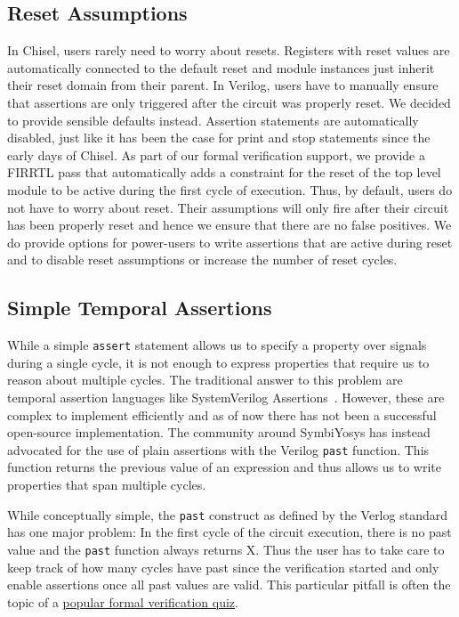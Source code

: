 \documentclass[conference]{IEEEtran}
\newcommand{\code}[1]{{\small{\texttt{#1}}}}
\begin{document}
\subsection{Reset Assumptions}\label{sec:reset}

In Chisel, users rarely need to worry about resets.
Registers with reset values are automatically connected to the default reset %
and module instances just inherit their reset domain from their parent.
In Verilog, users have to manually ensure that assertions are only triggered after the circuit was properly reset.
We decided to provide sensible defaults instead.
Assertion statements are automatically disabled, just like it has been the case for print and stop statements
since the early days of Chisel.
As part of our formal verification support, we provide a FIRRTL pass
that automatically adds a constraint for the reset of the top level module to be active during the first cycle of execution.
Thus, by default, users do not have to worry about reset. Their assumptions will only fire
after their circuit has been properly reset and hence we ensure that there are no false positives.
We do provide options for power-users to write assertions that are active during reset and to
disable reset assumptions or increase the number of reset cycles.


\subsection{Simple Temporal Assertions}\label{sec:past}


While a simple \code{assert} statement allows us to specify a property over signals during a single
cycle, it is not enough to express properties that require us to reason about multiple cycles.
The traditional answer to this problem are temporal assertion languages like SystemVerilog Assertions~\cite{SystemVerilog}.
However, these are complex to implement efficiently and as of now there has not been a successful open-source implementation.
The community around SymbiYosys has instead advocated for the use of plain assertions with the Verilog \code{past}
function. This function returns the previous value of an expression and thus allows us to write properties that span multiple cycles.

While conceptually simple, the \code{past} construct as defined by the Verlog standard has one major problem:
In the first cycle of the circuit execution, there is no past value and the \code{past} function always returns X.
Thus the user has to take care to keep track of how many cycles have past since the verification started and only enable assertions
once all past values are valid.
This particular pitfall is often the topic of a \href{http://zipcpu.com/quiz/2019/11/16/quiz07.html}{popular formal verification quiz}.
\end{document}
